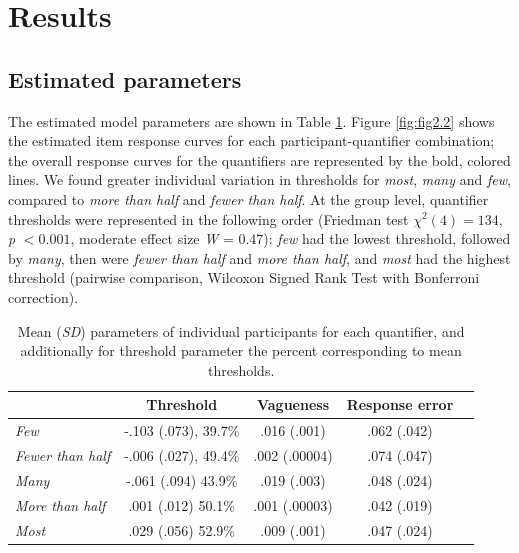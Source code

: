 \documentclass{article}
\begin{document}
\section{Results}
\subsection{Estimated parameters}
The estimated model parameters are shown in Table \ref{tab:tab2.1}. Figure \ref{fig:fig2.2} shows the estimated  item response curves for each participant-quantifier combination; the overall response curves for the quantifiers are represented by the bold, colored lines. We found greater individual variation in thresholds for \textit{most}, \textit{many} and \textit{few}, compared to \textit{more than half} and \textit{fewer than half}. At the group level, quantifier thresholds were represented in the following order (Friedman test $\chi^2(4) = 134$, \textit{p} $< 0.001$, moderate effect size \textit{W} = 0.47): \textit{few} had the lowest threshold, followed by \textit{many}, then were \textit{fewer than half} and \textit{more than half}, and \textit{most} had the highest threshold (pairwise comparison, Wilcoxon Signed Rank Test with Bonferroni correction).

\begin{table}[H]
    \centering
    \caption{Mean (\textit{SD}) parameters of individual participants for each quantifier, and additionally for threshold parameter the percent corresponding to mean thresholds.}
    \label{tab:tab2.1}
    \begin{tabular}{lcccc}\hline
         & Threshold & Vagueness & Response error  \\ \hline
         \textit{Few} & -.103 (.073), 39.7\%  & .016 (.001) & .062 (.042)\\
         \textit{Fewer than half} & -.006 (.027),
49.4\% & .002 (.00004) & .074 (.047)\\
         \textit{Many} & -.061 (.094)
43.9\% & .019 (.003) & .048 (.024)\\
         \textit{More than half} & .001 (.012)
50.1\% & .001 (.00003) & .042 (.019)\\
         \textit{Most} & .029 (.056)
52.9\% & .009 (.001) & .047 (.024)\\ \hline
    \end{tabular}
\end{table}
\end{document}
